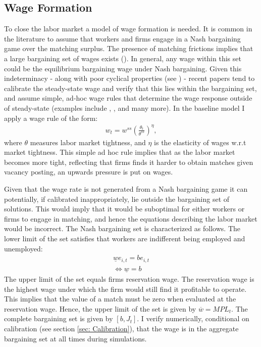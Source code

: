 \subsection{Wage Formation}
To close the labor market a model of wage formation is needed. It is common in the literature to assume that workers and firms engage in a Nash bargaining game over the matching surplus. The presence of matching frictions implies that a large bargaining set of wages exists (\citet{hall2005employment}). In general, any wage within this set could be the equilibrium bargaining wage under Nash bargaining. Given this indeterminacy - along with poor cyclical properties (see \citet{shimer2005cyclical}) - recent papers tend to calibrate the steady-state wage and verify that this lies within the bargaining set, and assume simple, ad-hoc wage rules that determine the wage response outside of steady-state (examples include \citet{gornemann2016doves}, \citet{mckay2016optimal}, \citet{den2018unemployment} and many more).
In the baseline model I apply a wage rule of the form:
\begin{gather*}
w_{t}=w^{ss}\left(\frac{\theta_{t}}{\theta^{ss}}\right)^{\eta},
\end{gather*}
where $\theta$ measures labor market tightness, and $\eta$ is the elasticity of wages w.r.t market tightness. This simple ad hoc rule implies that as the labor market becomes more tight, reflecting that firms finds it harder to obtain matches given vacancy posting, an upwards pressure is put on wages. 


Given that the wage rate is not generated from a Nash bargaining game it can potentially, if calibrated inappropriately, lie outside the bargaining set of solutions. This would imply that it would be suboptimal for either workers or firms to engage in matching, and hence the equations describing the labor market would be incorrect. The Nash bargaining set is characterized as follows. The lower limit of the set satisfies that workers are indifferent being employed and unemployed:
\begin{gather*}
\underline{w}e_{i,t} = be_{i,t} \\
\Leftrightarrow \underline{w} = b 
\end{gather*}
The upper limit of the set equals firms reservation wage. The reservation wage is the highest wage under which the firm would still find it profitable to operate. This implies that the value of a match must be zero when evaluated at the reservation wage. Hence, the upper limit of the set is given by $\overline{w} = MPL_{t}$.
The complete bargaining set is given by $\left[b,J_{t}\right]$. I verify numerically, conditional on calibration (see section \ref{sec: Calibration}), that the wage is in the aggregate bargaining set at all times during simulations.  




